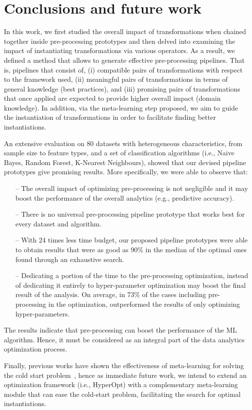 \section{Conclusions and future work}
\label{sec:conclusions}

In this work, we first studied the overall impact of transformations when chained together inside pre-processing prototypes and then delved into examining the impact of instantiating transformations via various operators. As a result, we defined a method that allows to generate effective pre-processing pipelines. That is, pipelines that consist of, (i) compatible pairs of transformations with respect to the framework used,  (ii) meaningful pairs of transformations in terms of general knowledge (best practices), and (iii) promising pairs of transformations that once applied are expected to provide higher overall impact (domain knowledge). 
In addition, via the meta-learning step proposed, we aim to guide the instantiation of transformations in order to facilitate finding better instantiations.

An extensive evaluation on 80 datasets with heterogeneous characteristics, from sample size to feature types, and a set of classification algorithms (i.e., Naive Bayes, Random Forest, K-Nearest Neighbours), showed that our devised pipeline prototypes give promising results. More specifically, we were able to observe that:
\begin{itemize}
    \item [--] The overall impact of optimizing pre-processing is not negligible and it may boost the performance of the overall analytics (e.g., predictive accuracy).
    \item [--] There is no universal pre-processing pipeline prototype that works best for every dataset and algorithm.
    \item [--] With 24 times less time budget, our proposed pipeline prototypes were able to obtain results that were as good as 90\% in the median of the optimal ones found through an exhaustive search.
    \item [--] Dedicating a portion of the time to the pre-processing optimization, instead of dedicating it entirely to hyper-parameter optimization may boost %
    the final result of the analysis. On average, in 73\% of the cases including pre-processing in the optimization, outperformed the results of only optimizing hyper-parameters.
\end{itemize}

The results indicate that pre-processing can boost the performance of the ML algorithm. Hence, it must be considered as an integral part of the data analytics optimization process. 

Finally, previous works have shown the effectiveness of meta-learning for solving the cold start problem~\cite{Feurer15AAAI}, hence as immediate future work, we intend to extend an optimization framework (i.e., HyperOpt) with a complementary meta-learning module that can ease the cold-start problem, facilitating the search for optimal instantiations.